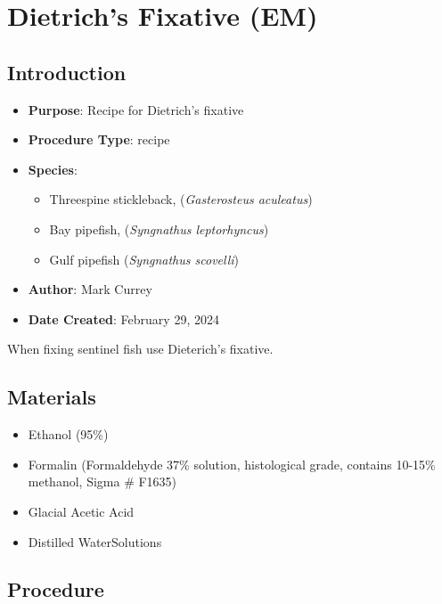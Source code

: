 \documentclass[
  letterpaper,
  DIV=11,
  numbers=noendperiod]{scrreprt}
\providecommand{\tightlist}{%
  \setlength{\itemsep}{0pt}\setlength{\parskip}{0pt}}\usepackage{longtable,booktabs,array}
\begin{document}
\hypertarget{sec-recipe-dietrichs_fix}{%
\chapter{Dietrich's Fixative (EM)}\label{sec-recipe-dietrichs_fix}}

\hypertarget{introduction-92}{%
\section{Introduction}\label{introduction-92}}

\begin{itemize}
\tightlist
\item
  \textbf{Purpose}: Recipe for Dietrich's fixative
\item
  \textbf{Procedure Type}: recipe
\item
  \textbf{Species}:

  \begin{itemize}
  \tightlist
  \item
    Threespine stickleback, (\emph{Gasterosteus aculeatus})
  \item
    Bay pipefish, (\emph{Syngnathus leptorhyncus})
  \item
    Gulf pipefish (\emph{Syngnathus scovelli})
  \end{itemize}
\item
  \textbf{Author}: Mark Currey
\item
  \textbf{Date Created}: February 29, 2024
\end{itemize}

When fixing sentinel fish use Dieterich's fixative.

\hypertarget{materials-87}{%
\section{Materials}\label{materials-87}}

\begin{itemize}
\tightlist
\item
  Ethanol (95\%)
\item
  Formalin (Formaldehyde 37\% solution, histological grade, contains
  10-15\% methanol, Sigma \# F1635)
\item
  Glacial Acetic Acid
\item
  Distilled WaterSolutions
\end{itemize}

\hypertarget{procedure-87}{%
\section{Procedure}\label{procedure-87}}
\end{document}
